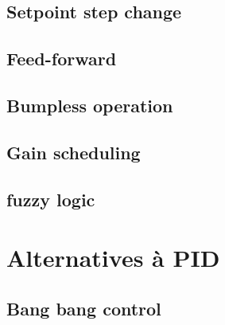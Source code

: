 \subsection{Setpoint step change}

\subsection{Feed-forward}

\subsection{Bumpless operation}

\subsection{Gain scheduling}

\subsection{fuzzy logic}

\section{Alternatives à PID}

\subsection{Bang bang control}

